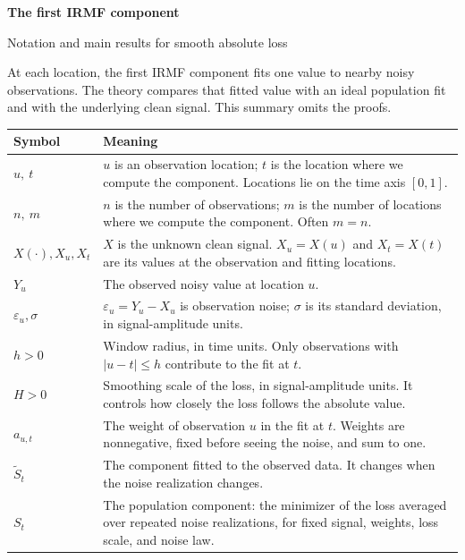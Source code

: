 \documentclass[11pt]{article}
\begin{document}
\begin{center}
  {\Large\bfseries The first IRMF component}\par\vspace{4pt}
  {\large Notation and main results for smooth absolute loss}
\end{center}

At each location, the first IRMF component fits one value to nearby noisy
observations.  The theory compares that fitted value with an ideal population
fit and with the underlying clean signal.  This summary omits the proofs.

{\small
\renewcommand{\arraystretch}{1.12}
\begin{tabular}{@{}p{27mm}p{\dimexpr\linewidth-27mm-2\tabcolsep\relax}@{}}
\textbf{Symbol} & \textbf{Meaning} \\
\hline
\(u,\ t\) & \(u\) is an observation location; \(t\) is the location where we
compute the component.  Locations lie on the time axis \([0,1]\). \\
\(n,\ m\) & \(n\) is the number of observations; \(m\) is the number of
locations where we compute the component.  Often \(m=n\). \\
\(X(\cdot),X_u,X_t\) & \(X\) is the unknown clean signal.  \(X_u=X(u)\) and
\(X_t=X(t)\) are its values at the observation and fitting locations. \\
\(Y_u\) & The observed noisy value at location \(u\). \\
\(\varepsilon_u,\sigma\) & \(\varepsilon_u=Y_u-X_u\) is observation noise;
\(\sigma\) is its standard deviation, in signal-amplitude units. \\
\(h>0\) & Window radius, in time units.  Only observations with
\(|u-t|\leq h\) contribute to the fit at \(t\). \\
\(H>0\) & Smoothing scale of the loss, in signal-amplitude units.  It
controls how closely the loss follows the absolute value. \\
\(a_{u,t}\) & The weight of observation \(u\) in the fit at \(t\).
Weights are nonnegative, fixed before seeing the noise, and sum to one. \\
\(\widetilde S_t\) & The component fitted to the observed data.  It changes
when the noise realization changes. \\
\(S_t\) & The population component: the minimizer of the loss averaged over
repeated noise realizations, for fixed signal, weights, loss scale, and noise law. \\
\end{tabular}}
\end{document}
